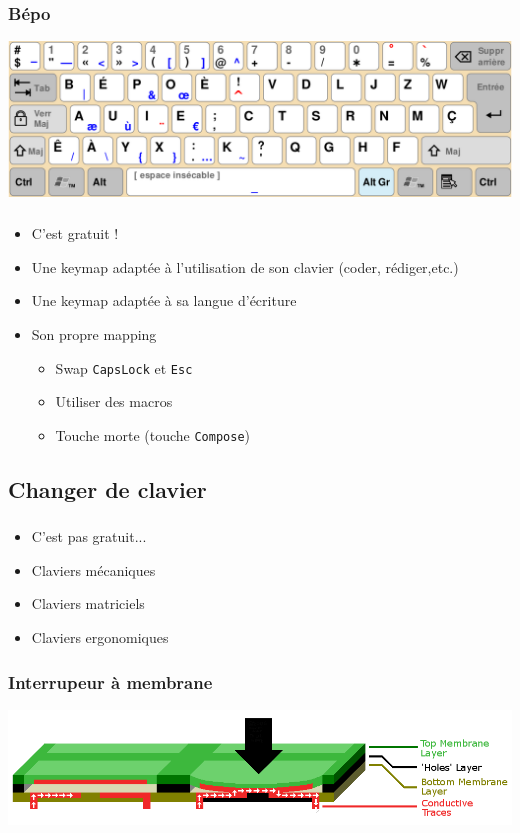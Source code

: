 \documentclass[c,12pt]{beamer}
\begin{document}
\begin{frame}
	\frametitle{Bépo}
	\begin{center}
		\includegraphics[scale=0.26]{Bepo.png}
	\end{center}
\end{frame}

\begin{frame}
	\frametitle{\subsecname}
	\begin{itemize}
		\item{C'est gratuit !}
		\item{Une keymap adaptée à l'utilisation de son clavier (coder,
			rédiger,etc.)}
		\item<1->{Une keymap adaptée à sa langue d'écriture}
		\item<2->{Son propre mapping}
			\begin{itemize}
				\item<3->{Swap \texttt{CapsLock} et \texttt{Esc}}
				\item<4->{Utiliser des macros}
				\item<5->{Touche morte (touche \texttt{Compose})}
			\end{itemize}
	\end{itemize}
\end{frame}

\subsection{Changer de clavier}

\begin{frame}
	\frametitle{\subsecname}
	\begin{itemize}
		\item<1->{C'est pas gratuit...}
		\item<2->{Claviers mécaniques}
		\item<3->{Claviers matriciels}
		\item<4->{Claviers ergonomiques}
	\end{itemize}
\end{frame}

\begin{frame}
	\frametitle{Interrupeur à membrane}
	\begin{center}
		\includegraphics[scale=0.32]{membrane.png}
	\end{center}
\end{frame}
\end{document}
